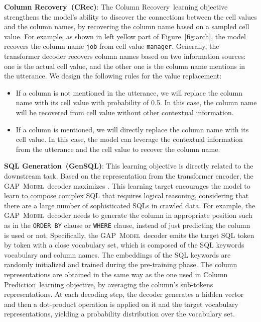 \documentclass[letterpaper]{article} \usepackage{aaai21}  \usepackage{times}  \usepackage{helvet} \usepackage{courier}  \usepackage[hyphens]{url}  \usepackage{graphicx} \usepackage{booktabs}
\newcommand{\modelnamelm}{\textsc{GAP~Model}}
\newcommand{\fullcolpred}{Column Prediction~}
\newcommand{\colrec}{CRec}
\newcommand{\fullcolrec}{Column Recovery~}
\newcommand{\gensql}{GenSQL}
\newcommand{\fullgensql}{SQL Generation~}
\begin{document}
\smallskip \noindent \textbf{\fullcolrec(\colrec)}:
The \fullcolrec learning objective strengthens the model's ability to discover the connections between the cell values and the column names, by recovering the column name based on a sampled cell value.
For example, as shown in left yellow part of Figure~\ref{fig:arch}, the model recovers the column name \texttt{job} from cell value \texttt{manager}.
Generally, the transformer decoder recovers column names based on two information sources: 
one is the actual cell value, and
the other one is the column name mentions in the utterance. 
We design the following rules for the value replacement:
\begin{itemize}
\item If a column is not mentioned in the utterance, we will replace the column name with its cell value with probability of 0.5.
In this case, the column name will be recovered from cell value without other contextual information.
\item If a column is mentioned, we will directly replace the column name with its cell value.
In this case, the model can leverage the contextual information from the utterance and the cell value to recover the column name.
\end{itemize}

\smallskip \noindent \textbf{\fullgensql(\gensql)}:
This learning objective is directly related to the downstream task.
Based on the representation from the transformer encoder, the \modelnamelm~decoder maximizes .
This learning target encourages the model to learn to compose complex SQL that requires logical reasoning, considering that there are a large number of sophisticated SQLs in crawled data.
For example, the \modelnamelm~decoder needs to generate the column in appropriate position such as in the \texttt{ORDER BY} clause or \texttt{WHERE} clause, instead of just predicting the column is used or not.
Specifically, the \modelnamelm~decoder emits the target SQL token by token with a close vocabulary set, which is composed of the SQL keywords vocabulary and column names.
The embeddings of the SQL keywords are randomly initialized and trained during the pre-training phase.
The column representations are obtained in the same way as the one used in \fullcolpred learning objective, by averaging the column's sub-tokens representations.
At each decoding step, the decoder generates a hidden vector and then a dot-product operation is applied on it and the target vocabulary representations, yielding a probability distribution over the vocabulary set.
\end{document}
